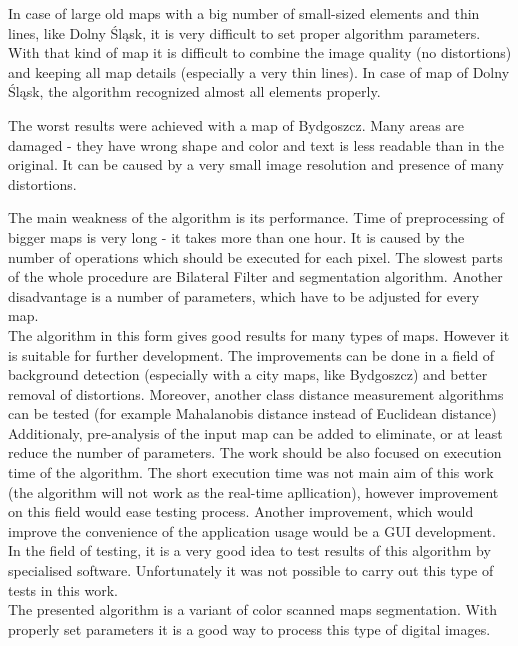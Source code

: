 \documentclass[a4paper,onecolumn,oneside,12pt]{memoir}
\begin{document}
In case of large old maps with a big number of small-sized elements and thin lines, like Dolny 
Śląsk, it is very difficult to set proper algorithm parameters. With that kind of map it is
difficult to combine the image quality (no distortions) and keeping all map details (especially a very
thin lines). In case of map of Dolny Śląsk, the algorithm recognized almost all elements properly.

The worst results were achieved with a map of Bydgoszcz. Many areas are damaged - they have wrong
shape and color and text is less readable than in the original. It can be caused by a very small
image resolution and presence of many distortions.

The main weakness of the algorithm is its performance. Time of preprocessing of bigger maps is very
long - it takes more than one hour. It is caused by the number of operations which should be
executed for each pixel. The slowest parts of the whole procedure are Bilateral Filter and
segmentation algorithm. Another disadvantage is a number of parameters, which have to be adjusted
for every map.\\

The algorithm in this form gives good results for many types of maps. However it is suitable for
further development. The improvements can be done in a field of background detection (especially with
a city maps, like Bydgoszcz) and better removal of distortions. Moreover, another class distance
measurement algorithms can be tested (for example Mahalanobis distance instead of Euclidean
distance) Additionaly, pre-analysis of the input map can be added to eliminate, or at least reduce
the number of parameters. The work should be also focused on execution time of the algorithm. The
short execution time was not main aim of this work (the algorithm will not work as the real-time
apllication), however improvement on this field would ease testing process. Another improvement,
which would improve the convenience of the application usage would be a GUI development.
In the field of testing, it is a very good idea to test results of this algorithm by specialised
software. Unfortunately it was not possible to carry out this type of tests in this work. \\

The presented algorithm is a variant of color scanned maps segmentation. With properly set
parameters it is a good way to process this type of digital images.

\newpage

\renewcommand\bibname{References}
\end{document}
